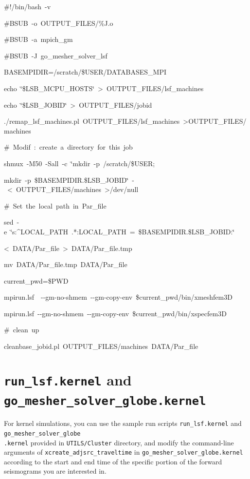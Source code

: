 \documentclass[oneside,english]{book}
\newenvironment{lyxcode}
{\begin{list}{}{
\setlength{\rightmargin}{\leftmargin}
\setlength{\listparindent}{0pt}%
\raggedright
\setlength{\itemsep}{0pt}
\setlength{\parsep}{0pt}
\normalfont\ttfamily}%
 \item[]}
{\end{list}}
\begin{document}
\begin{lyxcode}
\#!/bin/bash~-v

\#BSUB~-o~OUTPUT\_FILES/\%J.o

\#BSUB~-a~mpich\_gm

\#BSUB~-J~go\_mesher\_solver\_lsf

BASEMPIDIR=/scratch/\$USER/DATABASES\_MPI

echo~\char`\"{}\$LSB\_MCPU\_HOSTS\char`\"{}~>~OUTPUT\_FILES/lsf\_machines

echo~\char`\"{}\$LSB\_JOBID\char`\"{}~>~OUTPUT\_FILES/jobid

./remap\_lsf\_machines.pl~OUTPUT\_FILES/lsf\_machines~>OUTPUT\_FILES/machines

\#~Modif~:~create~a~directory~for~this~job

shmux~-M50~-Sall~-c~\char`\"{}mkdir~-p~/scratch/\$USER;

mkdir~-p~\$BASEMPIDIR.\$LSB\_JOBID\char`\"{}~-~<~OUTPUT\_FILES/machines~>/dev/null

\#~Set~the~local~path~in~Par\_file

sed~-e~\char`\"{}s:\textasciicircum{}LOCAL\_PATH~.{*}:LOCAL\_PATH~=~\$BASEMPIDIR.\$LSB\_JOBID:\char`\"{}

<~DATA/Par\_file~>~DATA/Par\_file.tmp

mv~DATA/Par\_file.tmp~DATA/Par\_file

current\_pwd=\$PWD

mpirun.lsf~~-{}-gm-no-shmem~-{}-gm-copy-env~\$current\_pwd/bin/xmeshfem3D

mpirun.lsf~-{}-gm-no-shmem~-{}-gm-copy-env~\$current\_pwd/bin/xspecfem3D

\#~clean~up

cleanbase\_jobid.pl~OUTPUT\_FILES/machines~DATA/Par\_file
\end{lyxcode}

\section{\texttt{run\_lsf.kernel} and \texttt{go\_mesher\_solver\_globe.kernel}}

For kernel simulations, you can use the sample run scripts \texttt{run\_lsf.kernel}
and \texttt{go\_mesher\_solver\_globe}~\\
\texttt{.kernel} provided in \texttt{UTILS/Cluster} directory, and modify
the command-line arguments of \texttt{xcreate\_adjsrc\_traveltime} in 
\texttt{go\_mesher\_solver\_globe.kernel} according to the start and end time
of the specific portion of the forward seismograms you are interested
in.
\end{document}
